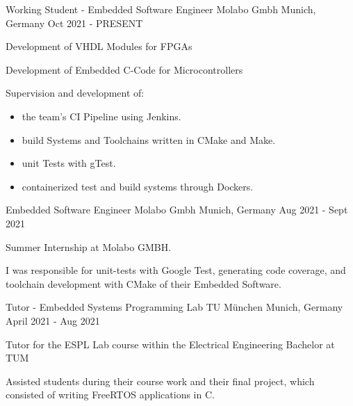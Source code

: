 
\begin{cventries}
  \cventry
    {Working Student - Embedded Software Engineer} %
    {Molabo Gmbh} %
    {Munich, Germany} %
    {Oct 2021 - PRESENT} %
    {
      \begin{cvitems} %
        \item {Development of VHDL Modules for FPGAs}
        \item {Development of Embedded C-Code for Microcontrollers}
        \item {Supervision and development of:}
          \begin{itemize}
            \item {the team's CI Pipeline using Jenkins.}
            \item {build Systems and Toolchains written in CMake and Make.}
            \item {unit Tests with gTest.}
            \item {containerized test and build systems through Dockers.}
          \end{itemize}
      \end{cvitems}
    }

  \cventry
    {Embedded Software Engineer} %
    {Molabo Gmbh} %
    {Munich, Germany} %
    {Aug 2021 - Sept 2021} %
    {
      \begin{cvitems} %
        \item {Summer Internship at Molabo GMBH.}
        \item {I was responsible for unit-tests with Google Test, generating 
              code coverage, and toolchain development with CMake of their Embedded Software.}
      \end{cvitems}
    }

  \cventry
    {Tutor - Embedded Systems Programming Lab} %
    {TU München} %
    {Munich, Germany} %
    {April 2021 - Aug 2021} %
    {
      \begin{cvitems} %
        \item {Tutor for the ESPL Lab course within the Electrical Engineering Bachelor at TUM }
        \item {Assisted students during their course work and their final project, which consisted of writing FreeRTOS applications in C.}
      \end{cvitems}
    }


\end{cventries}
